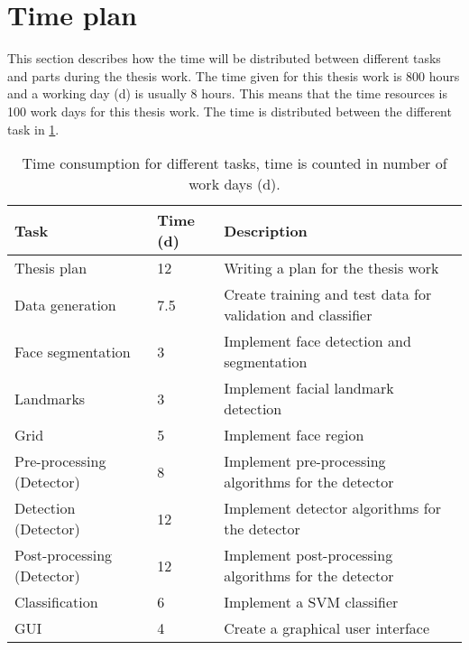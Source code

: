 \section{Time plan}

This section describes how the time will be distributed between different tasks and parts during the thesis work. The time given for this thesis work is 800 hours and a working day (d) is usually 8 hours. This means that the  time resources is 100 work days for this thesis work. The time is distributed between the different task in \cref{table:time_consumption}.

\begin{table}[H]
\centering
\caption{Time consumption for different tasks, time is counted in number of work days (d).}
\label{table:time_consumption}
\begin{tabular}{|p{}|p{}|p{}|}
	\hline
	\textbf{Task}              & \textbf{Time (d)} & \textbf{Description}                                        \\ \hline
	Thesis plan                & 12                & Writing a plan for the thesis work                          \\ \hline
	Data generation            & 7.5                 & Create training and test data for validation and classifier \\ \hline
	Face segmentation          & 3                 & Implement face detection and segmentation                   \\ \hline
	Landmarks                  & 3                 & Implement facial landmark detection                         \\ \hline
	Grid                       & 5                 & Implement face region                                       \\ \hline
	Pre-processing (Detector)  & 8                 & Implement pre-processing algorithms for the detector        \\ \hline
	Detection (Detector)       & 12                & Implement detector algorithms for the detector              \\ \hline
	Post-processing (Detector) & 12                & Implement post-processing algorithms for the detector       \\ \hline
	Classification             & 6                 & Implement a SVM classifier                                  \\ \hline
	GUI                        & 4                 & Create a graphical user interface                           \\ \hline

\end{tabular}
\end{table}
